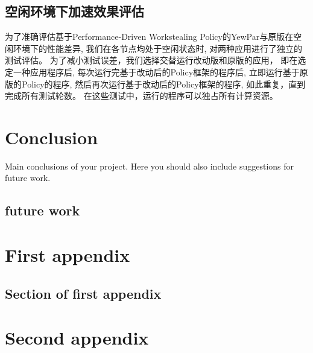 \documentclass{mproj}
\begin{document}
\section{空闲环境下加速效果评估}

为了准确评估基于Performance-Driven Workstealing Policy的YewPar与原版在空闲环境下的性能差异,
我们在各节点均处于空闲状态时,
对两种应用进行了独立的测试评估。
为了减小测试误差，我们选择交替运行改动版和原版的应用，
即在选定一种应用程序后,
每次运行完基于改动后的Policy框架的程序后,
立即运行基于原版的Policy的程序,
然后再次运行基于改动后的Policy框架的程序,
如此重复，直到完成所有测试轮数。
在这些测试中，运行的程序可以独占所有计算资源。











\chapter{Conclusion}\label{conclusion}

Main conclusions of your project. Here you should also include suggestions for future work.

\section{future work}


\appendix %
\chapter{First appendix}

\section{Section of first appendix}

\chapter{Second appendix}



\end{document}
